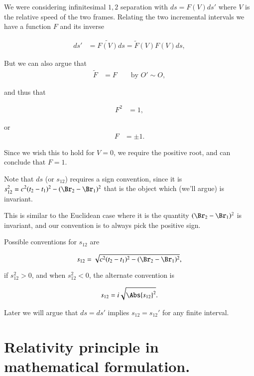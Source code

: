 We were considering infinitesimal $1,2$ separation with $ds = F(V) ds'$ where $V$ is the relative speed of the two frames.  Relating the two incremental intervals we have a function $F$ and its inverse

\begin{align*}
ds' &= \tilde{F(V)} ds = \tilde{F}(V) F(V) ds,
\end{align*}

But we can also argue that
\begin{align*}
\tilde{F} &= F \qquad \mbox{by $O' \sim O$},
\end{align*}

and thus that 

\begin{align*}
F^2 &= 1,
\end{align*}

or
\begin{align*}
F &= \pm 1.
\end{align*}

Since we wish this to hold for $V =0$, we require the positive root, and can conclude that $F = 1$.

Note that $ds$ (or $s_{12}$) requires a sign convention, since it is $s_{12}^2 = c^2(t_2 - t_1)^2 - (\Br_2 - \Br_1)^2$ that is the object which (we'll argue) is invariant.

This is similar to the Euclidean case where it is the quantity $(\Br_2 - \Br_1)^2$ is invariant, and our convention is to always  pick the positive sign.

Possible conventions for $s_{12}$ are

\begin{equation}\label{eqn:relativisticElectrodynamicsL3:50}
s_{12} = \sqrt{ c^2(t_2 - t_1)^2 - (\Br_2 - \Br_1)^2 },
\end{equation}

if $s_{12}^2 > 0$, and when $s_{12}^2 < 0$, the alternate convention is 

\begin{equation}\label{eqn:relativisticElectrodynamicsL3:55}
s_{12} = i \sqrt{\Abs{s_{12}}^2}.
\end{equation}

Later we will argue that $ds = ds'$ implies $s_{12} = s_{12}'$ for any finite interval.

\section{Relativity principle in mathematical formulation.}

